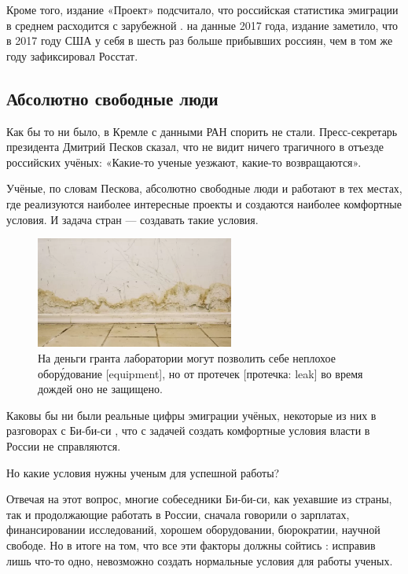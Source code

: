 Кроме того, издание «Проект» подсчитало, что российская статистика эмиграции в среднем расходится с зарубежной .  на данные 2017 года, издание заметило, что в 2017 году США  у себя в шесть раз больше прибывших россиян, чем в том же году зафиксировал Росстат.

\subsection{Абсолютно свободные люди}

Как бы то ни было, в Кремле с данными РАН спорить не стали. Пресс-секретарь президента Дмитрий Песков сказал, что не видит ничего трагичного в отъезде российских учёных: «Какие-то ученые уезжают, какие-то возвращаются».

Учёные, по словам Пескова, абсолютно свободные люди и работают в тех местах, где реализуются наиболее интересные проекты и создаются наиболее комфортные условия. И задача стран --- создавать такие условия.

\begin{figure}
    \begin{center}
        \includegraphics[width=0.58\textwidth]{img/wall.png}
    \end{center}
    \caption{На деньги гранта лаборатории могут позволить себе неплохое обор\'{у}дование [equipment], но от протечек [протечка: leak] во время дождей оно не защищено.}
\end{figure}
Каковы бы ни были реальные цифры эмиграции учёных, некоторые из них в разговорах с Би-би-си , что с задачей создать комфортные условия власти в России не справляются.

Но какие условия нужны ученым для успешной работы?

Отвечая на этот вопрос, многие собеседники Би-би-си, как уехавшие из страны, так и продолжающие работать в России, сначала говорили о зарплатах, финансировании исследований, хорошем оборудовании,  бюрократии, научной свободе. Но в итоге  на том, что все эти факторы должны сойтись : исправив лишь что-то одно, невозможно создать нормальные условия для работы ученых.

